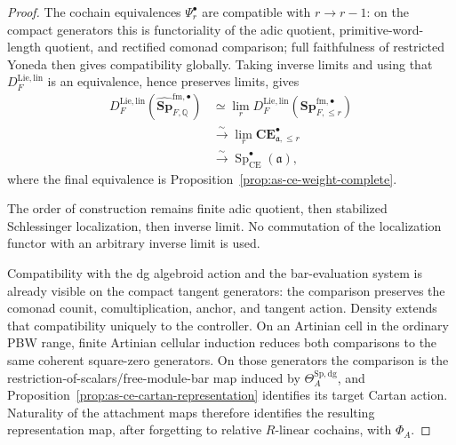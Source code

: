 \begin{proof}
The cochain equivalences $\Psi_r^\bullet$ are compatible with $r\to r-1$: on the compact generators
this is functoriality of the adic quotient, primitive-word-length quotient,
and rectified comonad comparison; full faithfulness of restricted Yoneda then
gives compatibility globally.  Taking inverse limits and using that
$D_F^{\mathrm{Lie,lin}}$ is an equivalence, hence preserves limits, gives
\[
\begin{aligned}
D_F^{\mathrm{Lie,lin}}
\left(
    \widehat{\mathbf{Sp}}_{F,\mathbb Q}^{\mathrm{fm},\bullet}
\right)
&\simeq
\lim_r
D_F^{\mathrm{Lie,lin}}
\left(
    \mathbf{Sp}^{\mathrm{fm},\bullet}_{F,\le r}
\right)\\
&\xrightarrow{\sim}
\lim_r
\mathbf{CE}^{\bullet}_{\mathfrak a,\le r}\\
&\xrightarrow{\sim}
\operatorname{Sp}_{\mathrm{CE}}^{\bullet}(\mathfrak a),
\end{aligned}
\]
where the final equivalence is
Proposition~\ref{prop:as-ce-weight-complete}.

The order of construction remains finite adic quotient, then stabilized
Schlessinger localization, then inverse limit.  No commutation of the
localization functor with an arbitrary inverse limit is used.

Compatibility with the dg algebroid action and the bar-evaluation system is
already visible on the compact tangent generators: the comparison preserves
the comonad counit, comultiplication, anchor, and tangent action.  Density
extends that compatibility uniquely to the controller.  On an Artinian cell in the ordinary PBW range, finite Artinian cellular
induction reduces both comparisons to the same coherent square-zero
generators.  On those generators the comparison is the
restriction-of-scalars/free-module-bar map induced by
$\Theta_A^{\mathrm{Sp,dg}}$, and
Proposition~\ref{prop:as-ce-cartan-representation} identifies its target
Cartan action.  Naturality of the attachment maps therefore identifies the
resulting representation map, after forgetting to relative $R$-linear
cochains, with $\Phi_A$.
\end{proof}

